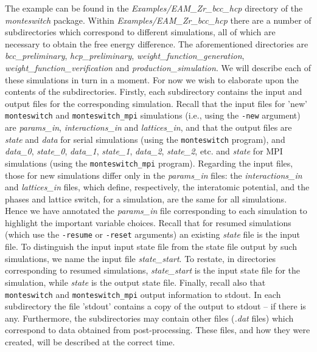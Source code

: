\documentclass{report}
\begin{document}
The example can be found in the \emph{Examples/EAM\_Zr\_bcc\_hcp} directory of the \emph{monteswitch} package. Within 
\emph{Examples/EAM\_Zr\_bcc\_hcp} there are a number of subdirectories which correspond to different simulations, all of which are 
necessary to obtain the free energy difference. The aforementioned directories are \emph{bcc\_preliminary}, \emph{hcp\_preliminary},
\emph{weight\_function\_generation}, \emph{weight\_function\_verification} and \emph{production\_simulation}. We will describe each
of these simulations in turn in a moment. For now we wish to elaborate upon the contents of the subdirectories. Firstly, each 
subdirectory contains the input and output files for the corresponding simulation. Recall that the input files for 'new' 
\texttt{monteswitch} and \texttt{monteswitch\_mpi} simulations (i.e., using the \texttt{-new} argument)
are \emph{params\_in}, \emph{interactions\_in} and \emph{lattices\_in}, and that the output files are \emph{state} and \emph{data} 
for serial simulations (using the \texttt{monteswitch} program), and \emph{data\_0}, \emph{state\_0}, \emph{data\_1}, \emph{state\_1},
\emph{data\_2}, \emph{state\_2}, etc. and \emph{state} for MPI simulations (using the \texttt{monteswitch\_mpi} program). Regarding the input
files, those for new simulations differ only in the \emph{params\_in} files: the \emph{interactions\_in} and \emph{lattices\_in} files,
which define, respectively, the interatomic potential, and the phases and lattice switch, for a simulation, 
are the same for all simulations. Hence we have annotated the \emph{params\_in} file corresponding to each simulation
to highlight the important variable choices. Recall that for resumed simulations (which use the \texttt{-resume} or \texttt{-reset} arguments)
an existing \emph{state} file is the input file. To distinguish the input input state file from the state file output
by such simulations, we name the input file \emph{state\_start}. To restate, in directories corresponding to resumed simulations,
\emph{state\_start} is the input state file for the simulation, while \emph{state} is the output state file.
Finally, recall also that \texttt{monteswitch} and \texttt{monteswitch\_mpi} output information to stdout. 
In each subdirectory the file 'stdout' contains a copy of the output to stdout -- if there is any. Furthermore, the 
subdirectories may contain other files (\emph{.dat} files) which correspond to data obtained from post-processing. These files,
and how they were created, will be described at the correct time.
\end{document}
